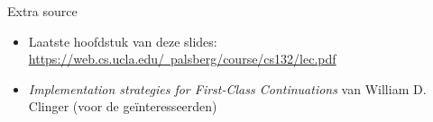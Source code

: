 \documentclass{beamer}
\begin{document}
\begin{frame}{Extra source}
\begin{itemize}
    \item Laatste hoofdstuk van deze slides: \href{https://web.cs.ucla.edu/~palsberg/course/cs132/lec.pdf}{https://web.cs.ucla.edu/~palsberg/course/cs132/lec.pdf}
    \item \emph{Implementation strategies for First-Class Continuations} van William D. Clinger (voor de geïnteresseerden)
\end{itemize}
\end{frame}
\end{document}
